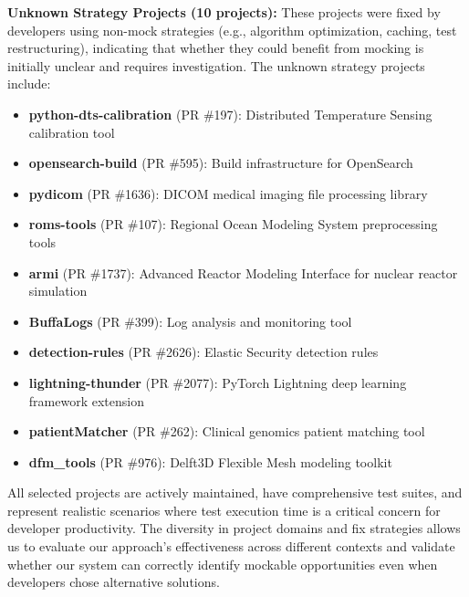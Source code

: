 \textbf{Unknown Strategy Projects (10 projects):} These projects were fixed by developers using non-mock strategies (e.g., algorithm optimization, caching, test restructuring), indicating that whether they could benefit from mocking is initially unclear and requires investigation. The unknown strategy projects include:

\begin{itemize}
    \item \textbf{python-dts-calibration} (PR \#197): Distributed Temperature Sensing calibration tool
    \item \textbf{opensearch-build} (PR \#595): Build infrastructure for OpenSearch
    \item \textbf{pydicom} (PR \#1636): DICOM medical imaging file processing library
    \item \textbf{roms-tools} (PR \#107): Regional Ocean Modeling System preprocessing tools
    \item \textbf{armi} (PR \#1737): Advanced Reactor Modeling Interface for nuclear reactor simulation
    \item \textbf{BuffaLogs} (PR \#399): Log analysis and monitoring tool
    \item \textbf{detection-rules} (PR \#2626): Elastic Security detection rules
    \item \textbf{lightning-thunder} (PR \#2077): PyTorch Lightning deep learning framework extension
    \item \textbf{patientMatcher} (PR \#262): Clinical genomics patient matching tool
    \item \textbf{dfm\_tools} (PR \#976): Delft3D Flexible Mesh modeling toolkit
\end{itemize}

All selected projects are actively maintained, have comprehensive test suites, and represent realistic scenarios where test execution time is a critical concern for developer productivity. The diversity in project domains and fix strategies allows us to evaluate our approach's effectiveness across different contexts and validate whether our system can correctly identify mockable opportunities even when developers chose alternative solutions.
